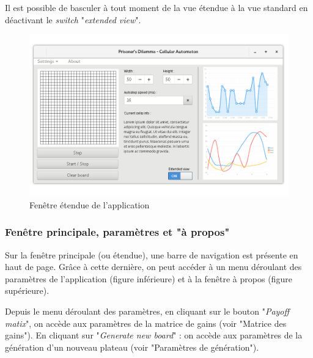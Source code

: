 \documentclass[a4paper, french]{article}
\begin{document}
Il est possible de basculer à tout moment de la vue étendue à la vue standard en déactivant le \textit{switch} "\textit{extended view}".

\vfill
\begin{figure}[htp]
    \centering
    \includegraphics[width=\linewidth]{interface/mainviewextended.png}
    \caption{Fenêtre étendue de l'application}
\end{figure}
\vfill

\pagebreak
\subsubsection{Fenêtre principale, paramètres et "à propos"}
Sur la fenêtre principale (ou étendue), une barre de navigation est présente en haut de page. Grâce à cette dernière, on peut accéder à un menu déroulant des paramètres de l'application (figure inférieure) et à la fenêtre à propos (figure supérieure).

Depuis le menu déroulant des paramètres, en cliquant sur le bouton "\textit{Payoff matix}", on accède aux paramètres de la matrice de gains (voir "Matrice des gains"). En cliquant sur "\textit{Generate new board}" : on accède aux paramètres de la génération d'un nouveau plateau (voir "Paramètres de génération").
\end{document}
